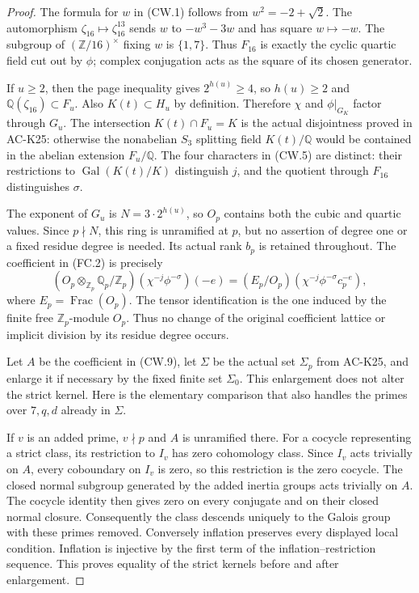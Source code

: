 \begin{proof}
The formula for $w$ in (CW.1) follows from
$w^2=-2+\sqrt2$.  The automorphism $\zeta_{16}\mapsto\zeta_{16}^{13}$
sends $w$ to $-w^3-3w$ and has square $w\mapsto-w$.
The subgroup of $(\mathbb Z/16)^\times$ fixing $w$ is $\{1,7\}$.
Thus $F_{16}$ is exactly the cyclic quartic field cut out by $\phi$;
complex conjugation acts as the square of its chosen generator.

If $u\geq2$, then the page inequality gives $2^{h(u)}\geq4$,
so $h(u)\geq2$ and $\mathbb Q(\zeta_{16})\subset F_u$.
Also $K(t)\subset H_u$ by definition.  Therefore $\chi$ and
$\phi|_{G_K}$ factor through $G_u$.  The intersection
$K(t)\cap F_u=K$ is the actual disjointness proved in AC-K25:
otherwise the nonabelian $S_3$ splitting field $K(t)/\mathbb Q$
would be contained in the abelian extension $F_u/\mathbb Q$.
The four characters in (CW.5) are distinct: their restrictions
to $\operatorname{Gal}(K(t)/K)$ distinguish $j$, and the quotient
through $F_{16}$ distinguishes $\sigma$.

The exponent of $G_u$ is $N=3\cdot2^{h(u)}$, so $O_p$ contains
both the cubic and quartic values.  Since $p\nmid N$, this ring is
unramified at $p$, but no assertion of degree one or a fixed residue
degree is needed.  Its actual rank $b_p$ is retained throughout.
The coefficient in (FC.2) is precisely
\[
 (O_p\otimes_{\mathbb Z_p}\mathbb Q_p/\mathbb Z_p)
                       (\chi^{-j}\phi^{-\sigma})(-e)
     =(E_p/O_p)(\chi^{-j}\phi^{-\sigma}c_p^{-e}),
 \tag{CW.9}
\]
where $E_p=\operatorname{Frac}(O_p)$.  The tensor identification
is the one induced by the finite free $\mathbb Z_p$-module $O_p$.
Thus no change of the original coefficient lattice or implicit
division by its residue degree occurs.

Let $A$ be the coefficient in (CW.9), let $\Sigma$ be the actual
set $\Sigma_p$ from AC-K25, and enlarge it if necessary by the
fixed finite set $\Sigma_0$.  This enlargement does not alter the
strict kernel.  Here is the elementary comparison that also handles
the primes over $7,q,d$ already in $\Sigma$.

If $v$ is an added prime, $v\nmid p$ and $A$ is unramified there.
For a cocycle representing a strict class, its restriction to $I_v$
has zero cohomology class.  Since $I_v$ acts trivially on $A$,
every coboundary on $I_v$ is zero, so this restriction is the zero
cocycle.  The closed normal subgroup generated by the added inertia
groups acts trivially on $A$.  The cocycle identity then gives zero
on every conjugate and on their closed normal closure.  Consequently
the class descends uniquely to the Galois group with these primes
removed.  Conversely inflation preserves every displayed local
condition.  Inflation is injective by the first term of the
inflation--restriction sequence.  This proves equality of the
strict kernels before and after enlargement.


\end{proof}

